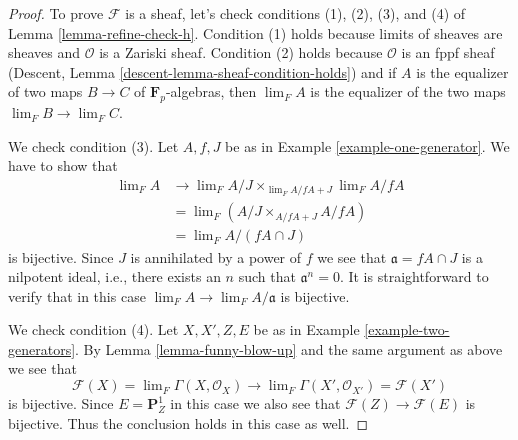 \documentclass[10pt,a4paper]{amsart}
\theoremstyle{plain}
\theoremstyle{definition}
\theoremstyle{remark}
\numberwithin{equation}{subsection}
\def\lim{\mathop{\mathrm{lim}}\nolimits}
\begin{document}
\begin{proof}
To prove $\mathcal{F}$ is a sheaf, let's check conditions
(1), (2), (3), and (4) of Lemma \ref{lemma-refine-check-h}.
Condition (1) holds because limits of sheaves are sheaves
and $\mathcal{O}$ is a Zariski sheaf. Condition (2) holds because
$\mathcal{O}$ is an fppf sheaf (Descent, Lemma
\ref{descent-lemma-sheaf-condition-holds}) and if $A$ is the equalizer
of two maps $B \to C$ of $\mathbf{F}_p$-algebras, then $\lim_F A$
is the equalizer of the two maps $\lim_F B \to \lim_F C$.

\medskip\noindent
We check condition (3). Let $A, f, J$ be as in
Example \ref{example-one-generator}.
We have to show that
\begin{align*}
\lim_F A
& \to
\lim_F A/J \times_{\lim_F A/fA + J} \lim_F A/fA \\
& =
\lim_F (A/J \times_{A/fA + J} A/fA) \\
& =
\lim_F A/(fA \cap J)
\end{align*}
is bijective. Since $J$ is annihilated by a power of $f$ we see that
$\mathfrak a = fA \cap J$ is a nilpotent ideal, i.e., there exists an
$n$ such that $\mathfrak a^n = 0$. It is straightforward
to verify that in this case $\lim_F A \to \lim_F A/\mathfrak a$
is bijective.

\medskip\noindent
We check condition (4). Let $X, X', Z, E$ be as in
Example \ref{example-two-generators}. By
Lemma \ref{lemma-funny-blow-up} and the same argument as above
we see that
$$
\mathcal{F}(X) = \lim_F \Gamma(X, \mathcal{O}_X)
\longrightarrow
\lim_F \Gamma(X', \mathcal{O}_{X'}) = \mathcal{F}(X')
$$
is bijective. Since $E = \mathbf{P}^1_Z$ in this case we also
see that $\mathcal{F}(Z) \to \mathcal{F}(E)$ is bijective.
Thus the conclusion holds in this case as well.
\end{proof}
\end{document}
